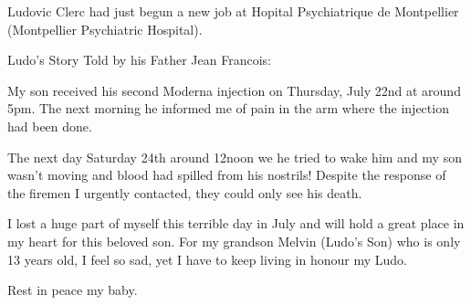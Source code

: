 Ludovic Clerc had just begun a new job at Hopital Psychiatrique de Montpellier
(Montpellier Psychiatric Hospital).

Ludo’s Story Told by his Father Jean Francois:

My son received his second Moderna injection on Thursday, July 22nd at around
5pm. The next morning he informed me of pain in the arm where the injection had
been done.

The next day Saturday 24th around 12noon we he tried to wake him and my son
wasn’t moving and blood had spilled from his nostrils! Despite the response of
the firemen I urgently contacted, they could only see his death.

I lost a huge part of myself this terrible day in July and will hold a great
place in my heart for this beloved son.  For my grandson Melvin (Ludo’s Son) who
is only 13 years old, I feel so sad, yet I have to keep living in honour my
Ludo.

Rest in peace my baby.


